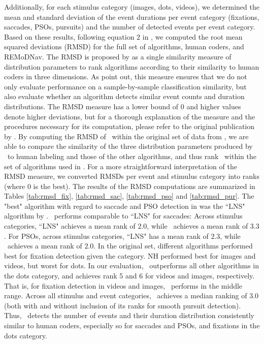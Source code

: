 Additionally, for each stimulus category (images, dots, videos), we determined
the mean and standard deviation of the event durations per event category (fixations,
saccades, PSOs, pursuits) and the number of detected events per event category.
Based on these results, following equation 2 in \citet{Andersson2017}, we computed
the root mean squared deviations (RMSD) for the full set of algorithms, human coders,
and REMoDNav. The RMSD is proposed by \cite{Andersson2017} as a single similarity
measure of distribution parameters to rank algorithms according to their similarity
to human coders in three dimensions. As \citet{Andersson2017} point out, this measure
ensures that we do not only evaluate performance on a sample-by-sample classification
similarity, but also evaluate whether an algorithm detects similar event counts and
duration distributions.
The RMSD measure has a lower bound of 0 and higher values denote
higher deviations, but for a thorough explanation of the measure and the procedures
necessary for its computation, please refer to the original publication by
\cite{Andersson2017}. By computing the RMSD of \remodnav\ within the original set
of data from \citet{Andersson2017}, we are able to compare the similarity of the
three distribution parameters produced by \remodnav\ to human labeling and those of
the other algorithms, and thus rank \remodnav\ within the set of algorithms used in
\citet{Andersson2017}.
For a more straightforward interpretation of the RMSD measure, we converted
RMSDs per event and stimulus category into ranks (where 0 is the best).
The results of the RMSD computations are summarized in Tables \ref{tab:rmsd_fix},
\ref{tab:rmsd_sac}, \ref{tab:rmsd_pso} and \ref{tab:rmsd_pur}.
The "best" algorithm with regard to saccade and PSO detection in \cite{Andersson2017}
was the ``LNS" algorithm by \cite{Larsson2013}. \remodnav\ performs comparable to
``LNS" for saccades: Across stimulus categories, ``LNS" achieves a mean rank of $2.0$,
while \remodnav\ achieves a mean rank of $3.3$. For PSOs, across
stimulus categories, ``LNS" has a mean rank of $2.3$, while \remodnav\ achieves a
mean rank of $2.0$.
In the original set, different algorithms performed best for fixation detection
given the category. NH performed best for images  and videos, but worst for dots.
In our evaluation, \remodnav\ outperforms all other
algorithms in the dots category, and achieves rank 5 and 6 for videos and images,
respectively. That is, for fixation detection in videos and images, \remodnav\
performs in the middle range. Across all stimulus and event categories,
\remodnav\ achieves a median ranking of $3.0$ (both with and without inclusion of
its ranks for smooth pursuit detection). Thus, \remodnav\ detects the number
of events and their duration distribution consistently similar to human coders,
especially so for saccades and PSOs, and fixations in the dots category.


